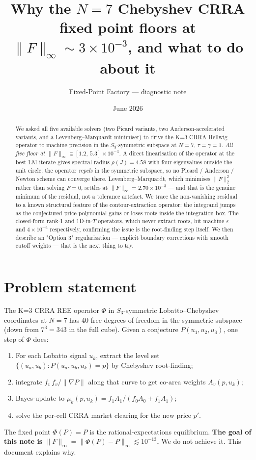 \documentclass[11pt]{article}
\title{Why the $N{=}7$ Chebyshev CRRA fixed point floors at $\|F\|_\infty\!\sim\!3\!\times\!10^{-3}$,
       and what to do about it}
\author{Fixed-Point Factory --- diagnostic note}
\date{June 2026}
\begin{document}
\maketitle

\begin{abstract}
\noindent
We asked all five available solvers (two Picard variants, two Anderson-accelerated
variants, and a Levenberg--Marquardt minimiser) to drive the K=3 CRRA Hellwig operator
to machine precision in the $S_3$-symmetric subspace at $N{=}7$, $\tau{=}\gamma{=}1$.
\emph{All five floor at $\|F\|_\infty \in [1.2,\,5.3]\!\times\!10^{-3}$.} A direct
linearisation of the operator at the best LM iterate gives spectral radius
$\rho(J)=4.58$ with four eigenvalues outside the unit circle: the operator
\emph{repels} in the symmetric subspace, so no Picard / Anderson / Newton scheme
can converge there. Levenberg--Marquardt, which minimises $\|F\|_2^2$ rather than
solving $F=0$, settles at $\|F\|_\infty = 2.70\!\times\!10^{-3}$ --- and that is
the genuine minimum of the residual, not a tolerance artefact. We trace the
non-vanishing residual to a known structural feature of the contour-extraction
operator: the integrand jumps as the conjectured price polynomial gains or loses
roots inside the integration box. The closed-form rank-1 and 1D-in-$T$ operators,
which never extract roots, hit machine $\varepsilon$ and $4\!\times\!10^{-6}$
respectively, confirming the issue is the root-finding step itself.
We then describe an "Option 3" regularisation --- explicit boundary corrections
with smooth cutoff weights --- that is the next thing to try.
\end{abstract}

\tableofcontents

\section{Problem statement}
The K=3 CRRA REE operator $\Phi$ in $S_3$-symmetric Lobatto--Chebyshev coordinates
at $N{=}7$ has 40 free degrees of freedom in the symmetric subspace (down from
$7^3=343$ in the full cube). Given a conjecture $P(u_1,u_2,u_3)$, one step of
$\Phi$ does:
\begin{enumerate}
  \item For each Lobatto signal $u_k$, extract the level set
        $\{(u_a,u_b) : P(u_a,u_b,u_k) = p\}$ by Chebyshev root-finding;
  \item integrate $f_v\,f_v / \|\nabla P\|$ along that curve to get
        co-area weights $A_v(p,u_k)$;
  \item Bayes-update to $\mu_k(p,u_k) = f_1 A_1 / (f_0 A_0 + f_1 A_1)$;
  \item solve the per-cell CRRA market clearing for the new price $p'$.
\end{enumerate}
The fixed point $\Phi(P) = P$ is the rational-expectations equilibrium.
\textbf{The goal of this note is $\|F\|_\infty = \|\Phi(P)-P\|_\infty
\lesssim 10^{-13}$.} We do not achieve it. This document explains why.
\end{document}

